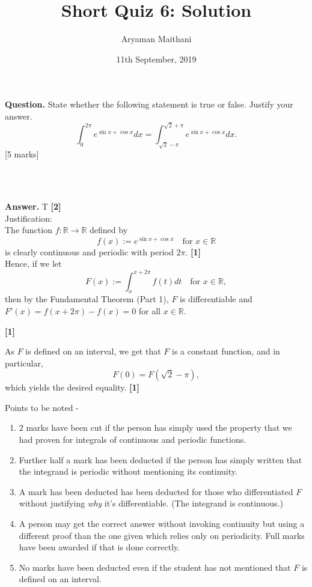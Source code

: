 \documentclass{article}
\title{Short Quiz 6: Solution}      %
\author{Aryaman Maithani}
\date{11th September, 2019}  		 %
\begin{document}
\maketitle

\hrulefill

\textbf{Question.} State whether the following statement is true or false. Justify your answer.
\[\int_{0}^{2\pi} e^{\sin x + \cos x} dx = \int_{\sqrt{2}-\pi}^{\sqrt{2}+\pi} e^{\sin x + \cos x} dx. \]
\hfill [5 marks]
\begin{flushright}
	\\~\\
\end{flushright}

\hrulefill

\textbf{Answer.} T \hfill \textbf{[2]}\\  %
Justification: \\
The function $f:\mathbb{R} \to \mathbb{R}$ defined by
\[f(x) := e^{\sin x + \cos x} \quad \text{for } x \in \mathbb{R}\]
is clearly continuous and periodic with period $2\pi.$ \hfill \textbf{[1]}\\
Hence, if we let
\[F(x) := \int_{x}^{x + 2\pi} f(t)dt \quad \text{for }x\in\mathbb{R}, \]
then by the Fundamental Theorem (Part 1), $F$ is differentiable and $F'(x) = f(x+2\pi) - f(x) = 0$ for all $x \in \mathbb{R}.$
\begin{flushright}
\textbf{[1]}
\end{flushright}

As $F$ is defined on an interval, we get that $F$ is a constant function, and in particular,
\[F(0) = F(\sqrt{2} - \pi),\]
which yields the desired equality. \hfill \textbf{[1]}

\hrulefill

\vspace{0.2 cm}

Points to be noted -
\begin{enumerate} 
	\item $2$ marks have been cut if the person has simply used the property that we had proven for integrals of continuous and periodic functions.
	\item Further half a mark has been deducted if the person has simply written that the integrand is periodic without mentioning its continuity.
	\item A mark has been deducted has been deducted for those who differentiated $F$ without justifying \emph{why} it's differentiable. (The integrand is continuous.)
	\item A person may get the correct answer without invoking continuity but using a different proof than the one given which relies only on periodicity. Full marks have been awarded if that is done correctly.
	\item No marks have been deducted even if the student has not mentioned that $F$ is defined on an interval.
\end{enumerate}
\end{document}
